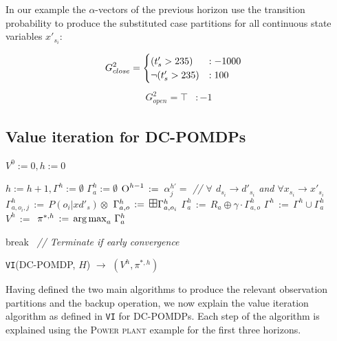 \documentclass{article}
\def\argmax{\operatornamewithlimits{arg\max}}
\begin{document}
In our example the $\alpha$-vectors of the previous horizon use the transition probability to produce the substituted case partitions for all continuous state variables $x'_{s_i}$: 

\begin{align}
\hspace{-4mm} 
G_{close}^2= 
\begin{cases}
(t_s'>235) &: -1000 \\
\neg(t_s'>235) &: 100 \\
\end{cases}
\end{align}
\begin{align*}
G_{open}^2=  \top &: -1
\end{align*}



\subsection{Value iteration for DC-POMDPs} 

\incmargin{.5em}
\linesnumbered
\begin{algorithm}[t!]
\vspace{-.5mm}
\dontprintsemicolon
{}
\Begin
{
   $V^0:=0, h:=0$\;
   {
       $h:=h+1, \Gamma^h :=\emptyset$\;
       {
			$\Gamma_{a}^h :=\emptyset$ \;       		
       		$\textsc{O}^{h-1} \,:=\,$ \;
       		 {
       			{
   	 		  		$\alpha_j^{h'}=$  \;
   	 		  		\emph{// $\forall$ $d_{s_i} \to d'_{s_i}$ and $\forall x_{s_i} \to x'_{s_i}$} \; 
   	 		    	$\Gamma_{a,o_i,j}^h \,:=\, P(o_i|xd'_s) \otimes$ \;
       	      	}
       	      	$\Gamma_{a,o}^h\,:=\,\textrm{\large $\boxplus$} \Gamma_{a,o_i}^h$\;
       	     }
           $\Gamma_a^{h} \,:=\,R_a \oplus \gamma \cdot \Gamma_{a,o}^h$\;
            $\Gamma^{h} \,:=\, \Gamma^{h} \cup \Gamma_a^{h}$\;
        }  
              $V^{h} \,:=\, $ \;
              $\pi^{*,h} \,:=\, \argmax_{a} \, \Gamma_a^{h}$\;

           {break $\,$ \emph{// Terminate if early convergence}\;}
   }
      \;
}
\caption{\footnotesize \texttt{VI}(DC-POMDP, $H$) $\longrightarrow$ $(V^h,\pi^{*,h})$ \label{alg:vi}}
\vspace{-1mm}
\end{algorithm}
\decmargin{.5em}
Having defined the two main algorithms to produce the relevant observation partitions and the backup operation, we now explain the value iteration algorithm as defined in \texttt{VI} for DC-POMDPs. Each step of the algorithm is explained using the \textsc{Power plant} example for the first three horizons.
\end{document}
